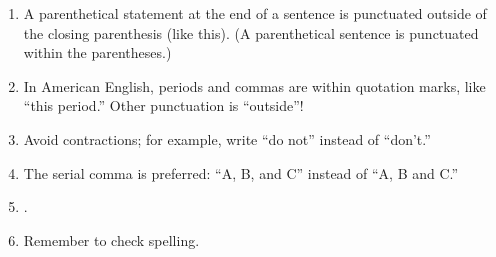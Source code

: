 \begin{enumerate}
	\item A parenthetical statement at the end of a sentence is punctuated outside of the closing parenthesis (like this). (A parenthetical sentence is punctuated within the parentheses.) 
	
	\item In American English, periods and commas are within quotation marks, like ``this period.'' Other punctuation is ``outside''! 
	
	\item Avoid contractions; for example, write ``do not'' instead of ``don't.'' 
	
	\item The serial comma is preferred: ``A, B, and C'' instead of ``A, B and C.'' 
	
	\item \emph{}. 
	
	\item Remember to check spelling. 

\end{enumerate}




